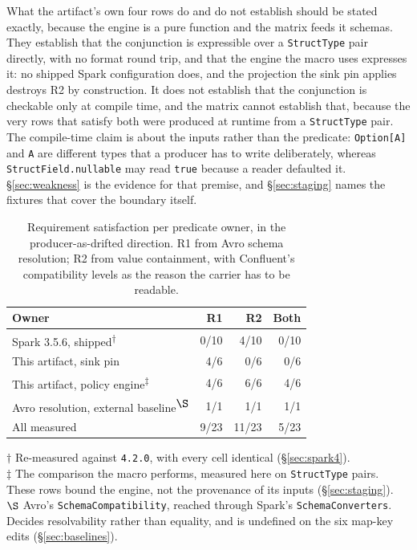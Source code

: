 What the artifact's own four rows do and do not establish should be stated exactly, because the engine is a pure function and the matrix feeds it schemas. They establish that the conjunction is expressible over a \texttt{StructType} pair directly, with no format round trip, and that the engine the macro uses expresses it: no shipped Spark configuration does, and the projection the sink pin applies destroys R2 by construction. It does not establish that the conjunction is checkable only at compile time, and the matrix cannot establish that, because the very rows that satisfy both were produced at runtime from a \texttt{StructType} pair. The compile-time claim is about the inputs rather than the predicate: \texttt{Option[A]} and \texttt{A} are different types that a producer has to write deliberately, whereas \texttt{StructField.nullable} may read \texttt{true} because a reader defaulted it. \S\ref{sec:weakness} is the evidence for that premise, and \S\ref{sec:staging} names the fixtures that cover the boundary itself.

\begin{table}[t]
  \caption{Requirement satisfaction per predicate owner, in the producer-as-drifted direction. R1 from Avro schema resolution; R2 from value containment, with Confluent's compatibility levels as the reason the carrier has to be readable.}
  \label{tab:requirements}
  \centering
  \scriptsize
  \begin{tabular}{lrrr}
    \toprule
    Owner & R1 & R2 & Both \\
    \midrule
    Spark 3.5.6, shipped\textsuperscript{$\dagger$} & 0/10 & 4/10 & 0/10 \\
    This artifact, sink pin & 4/6 & 0/6 & 0/6 \\
    This artifact, policy engine\textsuperscript{$\ddagger$} & 4/6 & 6/6 & 4/6 \\
    Avro resolution, external baseline\textsuperscript{$\S$} & 1/1 & 1/1 & 1/1 \\
    \midrule
    All measured & 9/23 & 11/23 & 5/23 \\
    \bottomrule
  \end{tabular}

  \vspace{0.3em}
  \raggedright\footnotesize $\dagger$ Re-measured against \texttt{4.2.0}, with every cell identical (\S\ref{sec:spark4}). \\
  $\ddagger$ The comparison the macro performs, measured here on \texttt{StructType} pairs. These rows bound the engine, not the provenance of its inputs (\S\ref{sec:staging}). \\
  $\S$ Avro's \texttt{SchemaCompatibility}, reached through Spark's \texttt{SchemaConverters}. Decides resolvability rather than equality, and is undefined on the six map-key edits (\S\ref{sec:baselines}).
\end{table}

